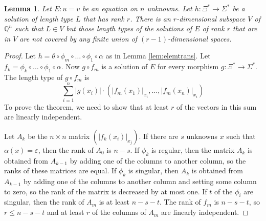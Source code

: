 \documentclass[submission]{eptcs}
\newtheorem{lemma}[theorem]{Lemma}
\theoremstyle{definition}
\newcommand{\eps}{\varepsilon}
\newcommand{\Q}{\mathbb Q}
\begin{document}
\begin{lemma} \label{lem:rdim}
Let $E: u = v$ be an equation on $n$ unknowns. Let $h: \Xi^* \to
\Sigma^*$ be a solution of length type $L$ that has rank $r$. There
is an $r$-dimensional subspace $V$ of $\Q^n$ such that $L \in V$ but
those length types of the solutions of $E$ of rank $r$ that are in
$V$ are not covered by any finite union of $(r-1)$-dimensional
spaces.
\end{lemma}
\begin{proof}
Let
\begin{math}
    h = \theta \circ \phi_m \circ \dots \circ \phi_1 \circ \alpha
\end{math}
as in Lemma \ref{lem:elemtrans}. Let $f_k = \phi_k \circ \dots \circ
\phi_1 \circ \alpha$. Now $g \circ f_m$ is a solution of $E$ for
every morphism $g: \Xi^* \to \Sigma^*$. The length type of $g \circ
f_m$ is
\begin{equation} \label{eq:2dimsol}
    \sum_{i=1}^n |g(x_i)| \cdot (|f_m(x_1)|_{x_i}, \dots, |f_m(x_n)|_{x_i})
\end{equation}
To prove the theorem, we need to show that at least $r$ of the
vectors in this sum are linearly independent.

Let $A_k$ be the $n \times n$ matrix
\begin{math}
    (|f_k(x_i)|_{x_j}).
\end{math}
If there are $s$ unknowns $x$ such that $\alpha(x) = \eps$, then the
rank of $A_0$ is $n-s$. If $\phi_k$ is regular, then the matrix
$A_{k}$ is obtained from $A_{k-1}$ by adding one of the columns to
another column, so the ranks of these matrices are equal. If
$\phi_k$ is singular, then $A_{k}$ is obtained from $A_{k-1}$ by
adding one of the columns to another column and setting some column
to zero, so the rank of the matrix is decreased by at most one. If
$t$ of the $\phi_i$ are singular, then the rank of $A_m$ is at least
$n-s-t$. The rank of $f_m$ is $n-s-t$, so $r \leq n-s-t$ and at
least $r$ of the columns of $A_m$ are linearly independent.
\end{proof}
\end{document}
